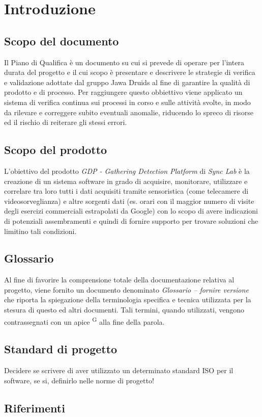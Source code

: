 \chapter{Introduzione}\label{Introduzione}

\section{Scopo del documento}
Il Piano di Qualifica è un documento su cui si prevede di operare per l’intera durata del progetto 
e il cui scopo è presentare e descrivere le strategie di verifica e validazione adottate 
dal gruppo Jawa Druids al fine di garantire la qualità di prodotto e di processo.  
Per raggiungere questo obbiettivo viene applicato un sistema di verifica continua sui processi in corso e 
sulle attività svolte, in modo da rilevare e correggere subito eventuali anomalie, riducendo lo spreco di risorse 
ed il rischio di reiterare gli stessi errori.
\section{Scopo del prodotto}
L'obiettivo del prodotto \textit{GDP - Gathering Detection Platform} di \textit{Sync Lab} è la creazione di un sistema software in 
grado di acquisire, monitorare, utilizzare e correlare tra loro tutti i dati acquisiti tramite sensoristica (come telecamere di videosorveglianza)
e altre sorgenti dati (es. orari con il maggior numero di visite degli esercizi commerciali estrapolati da Google) con lo
scopo di avere indicazioni di potenziali assembramenti e quindi di fornire supporto per trovare soluzioni che limitino tali condizioni.
\section{Glossario}
Al fine di favorire la comprensione totale della documentazione relativa al progetto, viene fornito un documento denominato \textit{Glossario -- fornire versione}
che riporta la spiegazione della terminologia specifica e tecnica utilizzata per la stesura di questo ed altri documenti.
Tali termini, quando utilizzati, vengono contrassegnati con un apice \textsuperscript{G} alla fine della parola.
\section{Standard di progetto}
Decidere se scrivere di aver utilizzato un determinato standard ISO per il software, se si, definirlo nelle norme di progetto!
\section{Riferimenti}
